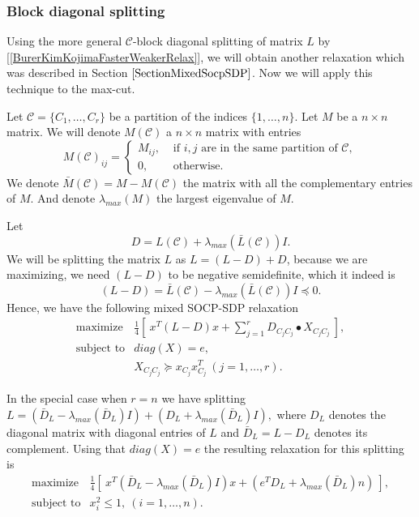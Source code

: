 \documentclass[12pt]{book}
\theoremstyle{definition}
\begin{document}
\subsubsection{Block diagonal splitting}

Using the more general $\mathcal{C}$-block diagonal splitting of matrix $L$ by [\ref{BurerKimKojimaFasterWeakerRelax}], we will obtain another relaxation which was described in Section $\ref{SectionMixedSocpSDP}$. Now we will apply this technique to the max-cut.

Let $\mathcal{C}=\{C_1,\dots ,C_r\}$ be a partition of the indices $\{1, \dots ,n\}$. Let $M$ be a $n\times n$ matrix. We will denote $M(\mathcal{C})$ a $n\times n$ matrix with entries 
\begin{equation*}
M(\mathcal{C})_{ij} = \left\lbrace \begin{array}{ll}
M_{ij}, & \mbox{ if } i,j \mbox{ are in the same partition of }\mathcal{C},\\
0, & \mbox{ otherwise.}
\end{array}\right.
\end{equation*} 
We denote $\bar{M}(\mathcal{C}) = M-M(\mathcal{C})$ the matrix with all the complementary entries of $M$.
And denote $\lambda_{max}(M)$  the largest eigenvalue of $M$.

Let 
$$ D = L(\mathcal{C}) + \lambda_{max}(\bar{L}(\mathcal{C}))I .$$
We will be splitting the matrix $L$ as  $L = (L - D) + D$, because we are maximizing, we need $(L-D)$ to be negative semidefinite, which it indeed is
$$(L - D)= \bar{L}(\mathcal{C}) - \lambda_{max}(\bar{L}(\mathcal{C}))I \preceq 0.$$
Hence, we have the following mixed SOCP-SDP relaxation 
\begin{equation}
\label{MaxCutMixedSocpSdpR}
\begin{array}{ll}
\mbox{maximize} & \frac{1}{4}\left[ \ x^T(L-D)x + \sum_{j=1}^r D_{C_jC_j}\bullet X_{C_jC_j} \ \right], \\
\mbox{subject to} & diag(X) = e ,\\
&	X_{C_jC_j}\succeq x_{C_j}x_{C_j}^T \ (j=1,\dots ,r).
\end{array}
\end{equation}

In the special case when $r = n$ we have splitting
$L = (\bar{D}_L - \lambda_{max}(\bar{D}_L)I) + (D_L + \lambda_{max}(\bar{D}_L)I),$
where $D_L$ denotes the diagonal matrix with diagonal entries of $L$
and $\bar{D}_L = L - D_L$ denotes its complement.
Using that $diag(X) = e$ the resulting relaxation for this splitting is
\begin{equation}
\label{MaxCutMixedSocpSdpN}
\begin{array}{ll}
\mbox{maximize} & \frac{1}{4}\left[ \ x^T(\bar{D}_L - \lambda_{max}(\bar{D}_L)I)x + (e^TD_L + \lambda_{max}(\bar{D}_L)n) \ \right], \\
\mbox{subject to} & x_i^2 \leq 1, \ (i=1,\dots ,n).
\end{array}
\end{equation}
\end{document}
